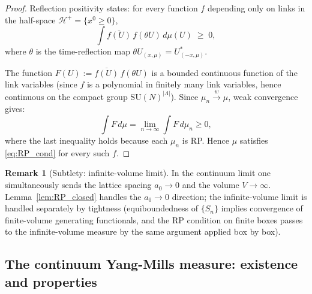 \documentclass[11pt,a4paper]{amsart}
\theoremstyle{definition}
\newtheorem{remark}[theorem]{Remark}
\newcommand{\SU}{\mathrm{SU}}
\begin{document}
\begin{proof}
Reflection positivity states: for every function $f$ depending only on links
in the half-space $\mathcal{H}^+ = \{x^0 \ge 0\}$,
\begin{equation}
\label{eq:RP_cond}
  \int \overline{f(U)}\,f(\theta U)\,d\mu(U) \;\ge\; 0,
\end{equation}
where $\theta$ is the time-reflection map $\theta U_{(x,\mu)} = U_{(-x,\mu)}^*$.

The function $F(U) := \overline{f(U)}\,f(\theta U)$ is a bounded continuous
function of the link variables (since $f$ is a polynomial in finitely many
link variables, hence continuous on the compact group $\SU(N)^{|\Lambda|}$).
Since $\mu_n \xrightarrow{w} \mu$, weak convergence gives:
\[
  \int F\,d\mu = \lim_{n\to\infty}\int F\,d\mu_n \ge 0,
\]
where the last inequality holds because each $\mu_n$ is RP.
Hence $\mu$ satisfies \eqref{eq:RP_cond} for every such $f$.
\end{proof}

\begin{remark}[Subtlety: infinite-volume limit]
\label{rem:RP_infvol}
In the continuum limit one simultaneously sends the lattice spacing $a_0\to 0$
and the volume $V\to\infty$.  Lemma~\ref{lem:RP_closed} handles the $a_0\to 0$
direction; the infinite-volume limit is handled separately by tightness
(equiboundedness of $\{S_n\}$ implies convergence of finite-volume generating
functionals, and the RP condition on finite boxes passes to the infinite-volume
measure by the same argument applied box by box).
\end{remark}

\subsection{The continuum Yang-Mills measure: existence and properties}
\label{sec:continuum_YM}
\end{document}
